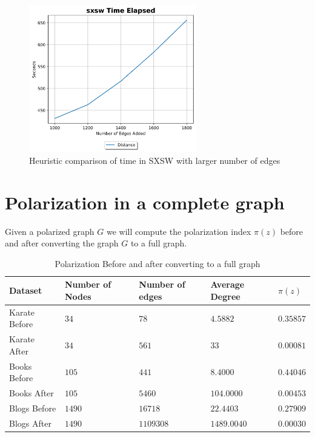 \begin{table}[H]
\begin{figure}[H]
	\centering
	\includegraphics[width=0.65\textwidth]{Figures/sxsw Time Elapsed 2}
	\caption{Heuristic comparison of time in SXSW with larger number of edges}
	\label{fig:sxsw_time}
\end{figure}


\clearpage

\section{Polarization in a complete graph}
\label{sec:fullgraph}
\vspace{20pt}
Given a polarized graph $G$ we will compute the polarization index $\pi(z)$ before and after converting the graph $G$ to a full graph. 

\begin{table}[!htbp]
 \centering
 \caption{Polarization Before and after converting to a full graph}
 \label{tab:fullgraph}
 \begin{tabular}{| l || l | l | l | l |}
 \hline
  Dataset & Number of Nodes & Number of edges & Average Degree & $\pi(z)$\\
  \hline
  \hline
  Karate Before & $34$ & $78$ & $4.5882$ &  $0.35857$\\
  \hline
  Karate After & $34$ & $561$ & $33$ &  $0.00081$\\
  \hline
  \hline
  Books Before & $105$ & $441$ & $8.4000$ &  $0.44046$\\
  \hline
  Books After & $105$ & $5460$ & $104.0000$ &  $0.00453$\\
  \hline
  \hline
  Blogs Before & $1490$ & $16718$ & $22.4403$ &  $0.27909$\\
  \hline
  Blogs After & $1490$ & $1109308$ & $1489.0040$ &  $0.00030$\\
  \hline
 \end{tabular}
 \end{table}


\end{table}
